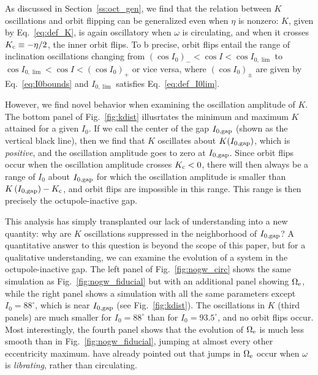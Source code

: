 \documentclass[
        fleqn,
        usenatbib,
    ]{mnras}
\newcommand*{\p}[1]{\left(#1\right)}
\begin{document}
As discussed in Section~\ref{ss:oct_gen}, we find that the relation between $K$
oscillations and orbit flipping can be generalized even when $\eta$ is nonzero:
$K$, given by Eq.~\eqref{eq:def_K}, is again oscillatory when $\omega$ is
circulating, and when it crosses $K_{\rm c} \equiv -\eta / 2$, the inner orbit
flips. To b precise, orbit flips entail the range of inclination oscillations
changing from $\p{\cos I_0}_- < \cos I < \cos I_{0, \lim}$ to $\cos I_{0, \lim}
< \cos I < \p{\cos I_0}_+$ or vice versa, where $\p{\cos I_0}_{\pm}$ are given
by Eq.~\eqref{eq:I0bounds} and $I_{0, \lim}$ satisfies Eq.~\eqref{eq:def_I0lim}.

However, we find novel behavior when examining the oscillation amplitude of $K$.
The bottom panel of Fig.~\ref{fig:kdist} illusrtates the minimum and maximum $K$
attained for a given $I_0$. If we call the center of the gap $I_{\rm 0, gap}$
(shown as the vertical black line), then we find that $K$ oscillates about
$K(I_{\rm 0, gap})$, which is \emph{positive}, and the oscillation amplitude
goes to zero at $I_{\rm 0, gap}$. Since orbit flips occur when the oscillation
amplitude crosses $K_{\rm c} < 0$, there will then always be a range of $I_0$
about $I_{\rm 0, gap}$ for which the oscillation amplitude is smaller than
$K\p{I_{\rm 0, gap}} - K_{\rm c}$, and orbit flips are impossible in this range.
This range is then precisely the octupole-inactive gap.

This analysis has simply transplanted our lack of understanding into a new
quantity: why are $K$ oscillations suppressed in the neighborhood of $I_{\rm
0, gap}$? A quantitative answer to this question is beyond the scope of this
paper, but for a qualitative understanding, we can examine the evolution of a
system in the octupole-inactive gap. The left panel of Fig.~\ref{fig:nogw_circ}
shows the same simulation as Fig.~\ref{fig:nogw_fiducial} but with an additional
panel showing $\Omega_{\rm e}$, while the right panel shows a simulation with
all the same parameters except $I_0 = 88^\circ$, which is near $I_{\rm 0, gap}$
(see Fig.~\ref{fig:kdist}). The oscillations in $K$ (third panels) are much
smaller for $I_0 = 88^\circ$ than for $I_0 = 93.5^\circ$, and no orbit flips
occur. Most interestingly, the fourth panel shows that the evolution of
$\Omega_{\rm e}$ is much less smooth than in Fig.~\ref{fig:nogw_fiducial},
jumping at almost every other eccentricity maximum. \citet{katz2011long} have
already pointed out that jumps in $\Omega_{\rm e}$ occur when $\omega$ is
\emph{librating}, rather than circulating.
\end{document}

